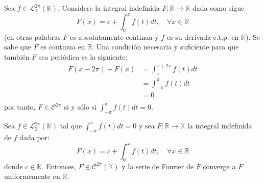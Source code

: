 \documentclass[12pt]{report}
\newcounter{it}
\theoremstyle{largebreak}
\newcommand\cf[3]{\ensuremath{#1:#2\rightarrow#3}}
\begin{document}
    \begin{obs}
        Sea $f\in\mathcal{L}_1^{2\pi}(\mathbb{K})$. Considere la integral indefinida $\cf{F}{\mathbb{R}}{\mathbb{K}}$ dada como sigue
        \begin{equation*}
            F(x)=c+\int_0^xf(t)dt,\quad\forall x\in\mathbb{R}
        \end{equation*}
        (en otras palabras $F$ es absolutamente continua y $f$ es su derivada c.t.p. en $\mathbb{R}$). Se sabe que $F$ es continua en $\mathbb{R}$. Una condición necesaria y suficiente para que también $F$ sea periódica es la siguiente:
        \begin{equation*}
            \begin{split}
                F(x-2\pi)-F(x)&=\int_x^{ x+2\pi}f(t)dt\\
                &=\int_{-\pi}^{\pi}f(t)dt\\
                &=0\\
            \end{split}
        \end{equation*}
        por tanto, $F\in\mathcal{C}^{2\pi}$ si y sólo si $\int_{-\pi}^\pi f(t)dt=0$.
    \end{obs}

    \begin{theor}
        Sea $f\in\mathcal{L}_2^{2\pi}(\mathbb{K})$ tal que $\int_{-\pi}^\pi f(t)dt=0$ y sea $\cf{F}{\mathbb{R}}{\mathbb{K}}$ la integral indefinida de $f$ dada por:
        \begin{equation*}
            F(x)=c+\int_{ 0}^xf(t)dt,\quad\forall x\in\mathbb{R}
        \end{equation*}
        donde $c\in\mathbb{K}$. Entonces, $F\in\mathcal{C}^{2\pi}(\mathbb{K})$ y la serie de Fourier de $F$ converge a $F$ uniformemente en $\mathbb{R}$.
    \end{theor}
\end{document}

